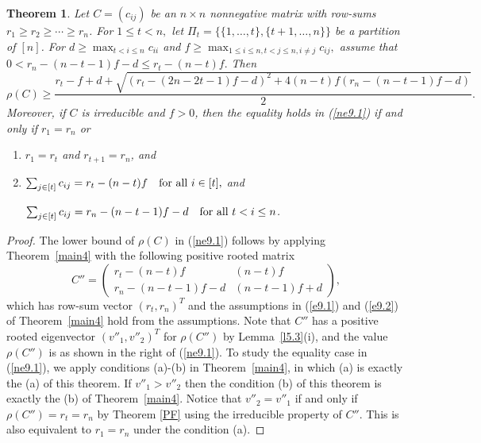 \documentclass[final,3p, times, 12pt]{elsarticle}
\theoremstyle{plain}
\newtheorem{thm}{Theorem}[section]
\theoremstyle{definition}
\theoremstyle{remark}
\numberwithin{equation}{section}
\begin{document}
\begin{thm}\label{main5}
Let
$C=(c_{ij})$ be an $n\times n$ nonnegative matrix with row-sums $r_1\geq r_2\geq \cdots \geq r_n$.
For $1\leq t< n,$ let $\Pi_t=\{\{1, \ldots, t\}, \{t+1, \ldots, n\}\}$ be a partition of $[n]$.
For $d\geq\max_{t<i\leq n}c_{ii}$ and $f\geq\max_{1\leq i\leq n, t<j\leq n, i\not=j}c_{ij},$
assume that $0<r_n-(n-t-1)f-d\leq r_t-(n-t)f.$
Then
\begin{equation}\label{ne9.1}\rho(C)\geq \frac{r_t-f+d+\sqrt{(r_t-(2n-2t-1)f-d)^2+4(n-t)f(r_n-(n-t-1)f-d)}}{2}.\end{equation}
Moreover, if $C$ is irreducible and $f>0$, then the equality holds in (\ref{ne9.1}) if and only if $r_1=r_n$ or
\begin{enumerate}
\item[(a)] $r_1=r_t$ and $r_{t+1}=r_n$, and
\item[(b)]
$\sum_{j\in [t]}c_{ij} =r_t-(n-t)f\quad \hbox{for all  $i\in [t]$},$ and

$\sum_{j\in [t]}c_{ij} =r_n-(n-t-1)f-d\quad \hbox{for all  $t<i\leq n$}$.
\end{enumerate}
\end{thm}
\begin{proof} The lower bound of $\rho(C)$ in (\ref{ne9.1}) follows by
applying Theorem~\ref{main4} with the following positive rooted matrix
$$C''=\begin{pmatrix}
 r_t-(n-t)f & (n-t)f \\
 r_n-(n-t-1)f-d& (n-t-1)f+d
 \end{pmatrix},$$
 which has row-sum vector $(r_t, r_n)^T$ and the assumptions in (\ref{e9.1}) and (\ref{e9.2}) of Theorem~\ref{main4} hold from the assumptions.
 Note that $C''$ has a positive rooted eigenvector  $(v''_1, v''_2)^T$
 for $\rho(C'')$ by  Lemma~\ref{l5.3}(i), and the value
  $\rho(C'')$ is as shown  in  the right of (\ref{ne9.1}).
To study the equality case in (\ref{ne9.1}), we apply conditions (a)-(b) in Theorem~\ref{main4},
in which (a) is exactly the (a) of this theorem.
If $v''_1>v''_2$ then the condition (b) of this theorem is exactly the (b) of Theorem~\ref{main4}.
Notice that  $v''_2=v''_1$ if and only if  $\rho(C'')=r_t=r_n$ by Theorem \ref{PF}
using the irreducible property of  $C''$. This is also equivalent to  $r_1=r_n$ under the condition (a).
\end{proof}
\end{document}
